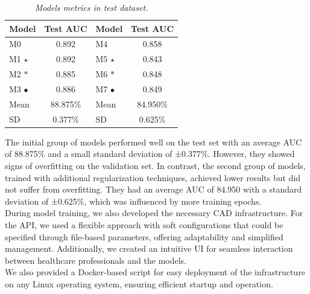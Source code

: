 \begin{table}[H]
\centering
\begin{tabular}{lc|lc}
    \toprule
  \textbf{Model} & \textbf{Test AUC} & \cellcolor{gray!50}\textbf{Model} & \cellcolor{gray!50}\textbf{Test AUC}  \\
\midrule
 M0 & 0.892 & \cellcolor{gray!50}M4 & \cellcolor{gray!50}0.858 \\
 M1 $\star$ & 0.892 & \cellcolor{gray!50}M5 $\star$ & \cellcolor{gray!50}0.843 \\
 M2 $\ast$ &  0.885 &  \cellcolor{gray!50}M6 $\ast$ & \cellcolor{gray!50}0.848 \\
 M3 $\bullet$ & 0.886 & \cellcolor{gray!50}M7 $\bullet$ & \cellcolor{gray!50}0.849 \\
 \midrule
Mean &  88.875\% & \cellcolor{gray!50}Mean & \cellcolor{gray!50}84.950\%  \\
SD &  0.377\%  &   \cellcolor{gray!50}SD &  \cellcolor{gray!50}0.625\%  \\

\bottomrule
\end{tabular}
\caption[Models metrics in test dataset]
  {\textit{Models metrics in test dataset.}}
{\label{table:test-set-resume-metrics}}
\end{table}

The initial group of models performed well on the test set with an average AUC
of 88.875\% and a small standard deviation of ±0.377\%. However, they showed
signs of overfitting on the validation set. In contrast, the second group of
models, trained with additional regularization techniques, achieved lower
results but did not suffer from overfitting. They had an average AUC of 84.950%
with a standard deviation of ±0.625\%, which was influenced by more training
epochs. \\

During model training, we also developed the necessary CAD infrastructure. For
the API, we used a flexible approach with soft configurations that could be
specified through file-based parameters, offering adaptability and simplified
management. Additionally, we created an intuitive UI for seamless interaction
between healthcare professionals and the models. \\

We also provided a Docker-based script for easy deployment of the
infrastructure on any Linux operating system, ensuring efficient startup and
operation.
